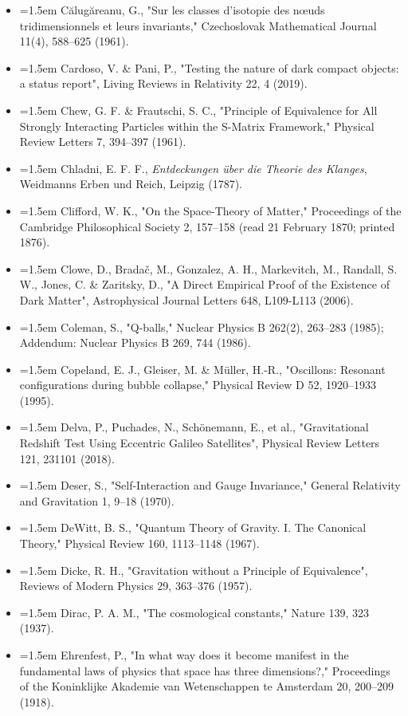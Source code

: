 \documentclass[11pt,a4paper]{article}
\begin{document}
\begin{itemize}[leftmargin=1.5em,label={}]
\item \hangindent=1.5em Călugăreanu, G., "Sur les classes d'isotopie des nœuds tridimensionnels et leurs invariants," Czechoslovak Mathematical Journal 11(4), 588–625 (1961).
\item \hangindent=1.5em Cardoso, V. \& Pani, P., "Testing the nature of dark compact objects: a status report", Living Reviews in Relativity 22, 4 (2019).
\item \hangindent=1.5em Chew, G. F. \& Frautschi, S. C., "Principle of Equivalence for All Strongly Interacting Particles within the S-Matrix Framework," Physical Review Letters 7, 394–397 (1961).
\item \hangindent=1.5em Chladni, E. F. F., \emph{Entdeckungen über die Theorie des Klanges}, Weidmanns Erben und Reich, Leipzig (1787).
\item \hangindent=1.5em Clifford, W. K., "On the Space-Theory of Matter," Proceedings of the Cambridge Philosophical Society 2, 157–158 (read 21 February 1870; printed 1876).
\item \hangindent=1.5em Clowe, D., Bradač, M., Gonzalez, A. H., Markevitch, M., Randall, S. W., Jones, C. \& Zaritsky, D., "A Direct Empirical Proof of the Existence of Dark Matter", Astrophysical Journal Letters 648, L109-L113 (2006).
\item \hangindent=1.5em Coleman, S., "Q-balls," Nuclear Physics B 262(2), 263–283 (1985); Addendum: Nuclear Physics B 269, 744 (1986).
\item \hangindent=1.5em Copeland, E. J., Gleiser, M. \& Müller, H.-R., "Oscillons: Resonant configurations during bubble collapse," Physical Review D 52, 1920–1933 (1995).
\item \hangindent=1.5em Delva, P., Puchades, N., Schönemann, E., et al., "Gravitational Redshift Test Using Eccentric Galileo Satellites", Physical Review Letters 121, 231101 (2018).
\item \hangindent=1.5em Deser, S., "Self-Interaction and Gauge Invariance," General Relativity and Gravitation 1, 9–18 (1970).
\item \hangindent=1.5em DeWitt, B. S., "Quantum Theory of Gravity. I. The Canonical Theory," Physical Review 160, 1113–1148 (1967).
\item \hangindent=1.5em Dicke, R. H., "Gravitation without a Principle of Equivalence", Reviews of Modern Physics 29, 363–376 (1957).
\item \hangindent=1.5em Dirac, P. A. M., "The cosmological constants," Nature 139, 323 (1937).
\item \hangindent=1.5em Ehrenfest, P., "In what way does it become manifest in the fundamental laws of physics that space has three dimensions?," Proceedings of the Koninklijke Akademie van Wetenschappen te Amsterdam 20, 200–209 (1918).

\end{itemize}
\end{document}
